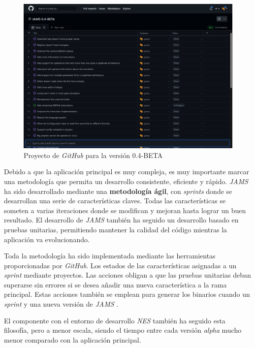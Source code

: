 \begin{figure}[h]
    \centering
    \includegraphics[width=\textwidth]{images/introduction/github}
    \caption{Proyecto de \textit{GitHub} para la versión 0.4-BETA}
    \label{fig:introduccion-github}
\end{figure}

Debido a que la aplicación principal es muy compleja,
es muy importante marcar una metodología que permita un
desarrollo consistente, eficiente y rápido.
\textit{JAMS} ha sido desarrollado mediante una \textbf{metodología ágil},
con \textit{sprints} donde se desarrollan una serie de características claves.
Todas las características se someten a varias iteraciones donde se modifican y mejoran hasta lograr un
buen resultado.
El desarrollo de \textit{JAMS} también ha seguido un desarrollo
basado en pruebas unitarias, permitiendo mantener la calidad del
código mientras la aplicación va evolucionando.

Toda la metodología ha sido implementada mediante
las herramientas proporcionadas por \textit{GitHub}.
Los estados de las características asignadas a un \textit{sprint}
 mediante proyectos.
Las acciones obligan a que las pruebas unitarias deban superarse
sin errores si se desea añadir una nueva característica a la rama principal.
Estas acciones también se emplean para generar los binarios
cuando  un \textit{sprint}  y
 una
nueva versión de \textit{JAMS} .

El componente con el entorno de desarrollo \textit{NES}
también ha seguido esta filosofía, pero a menor escala, siendo el
tiempo entre cada versión \textit{alpha} mucho menor comparado
con la aplicación principal.
